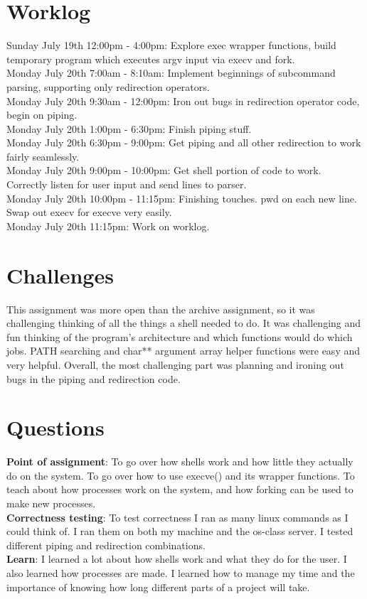 \documentclass[11pt]{article}
\begin{document}
\section{Worklog}
Sunday July 19th 12:00pm - 4:00pm: Explore exec wrapper functions, build temporary program which executes argv input via execv and fork. \\
Monday July 20th 7:00am - 8:10am: Implement beginnings of subcommand parsing, supporting only redirection operators. \\
Monday July 20th 9:30am - 12:00pm: Iron out bugs in redirection operator code, begin on piping. \\
Monday July 20th 1:00pm - 6:30pm: Finish piping stuff. \\
Monday July 20th 6:30pm - 9:00pm: Get piping and all other redirection to work fairly seamlessly. \\
Monday July 20th 9:00pm - 10:00pm: Get shell portion of code to work. Correctly listen for user input and send lines to parser. \\
Monday July 20th 10:00pm - 11:15pm: Finishing touches. pwd on each new line. Swap out execv for execve very easily. \\
Monday July 20th 11:15pm: Work on worklog. \\

\section{Challenges}
This assignment was more open than the archive assignment, so it was challenging thinking of all the things a shell needed to do. It was challenging and fun
thinking of the program's architecture and which functions would do which jobs. PATH searching and char** argument array helper functions were easy and very helpful. 
Overall, the most challenging part was planning and ironing out bugs in the piping and redirection code. \\

\section{Questions}
\textbf{Point of assignment}: To go over how shells work and how little they actually do on the system. To go over how to use execve() and its wrapper functions. To 
teach about how processes work on the system, and how forking can be used to make new processes. \\


\textbf{Correctness testing}: To test correctness I ran as many linux commands as I could think of. I ran them on both my machine and the os-class server. I tested
different piping and redirection combinations. \\

\textbf{Learn}: I learned a lot about how shells work and what they do for the user. I also learned how processes are made. I learned how to manage my time and the
importance of knowing how long different parts of a project will take. \\
\end{document}

